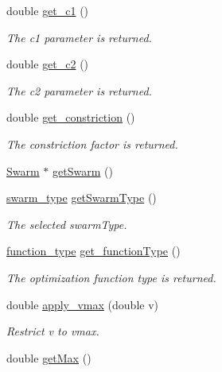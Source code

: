 \begin{CompactItemize}
double \hyperlink{classPSO_93bb160787761b05a7a8512771ac0117}{get\_\-c1} ()
\begin{CompactList}\small\item\em The c1 parameter is returned. \item\end{CompactList}\item 
double \hyperlink{classPSO_39340d6c779a00395bca0b293aa081a9}{get\_\-c2} ()
\begin{CompactList}\small\item\em The c2 parameter is returned. \item\end{CompactList}\item 
double \hyperlink{classPSO_13988ca5dfb95908547160ba71cf8c00}{get\_\-constriction} ()
\begin{CompactList}\small\item\em The constriction factor is returned. \item\end{CompactList}\item 
\hyperlink{classSwarm}{Swarm} $\ast$ \hyperlink{classPSO_73b6f8b856198c230a8e8820c0ff9754}{getSwarm} ()
\item 
\hyperlink{pso_8h_42bcedc2c7cf9459c9669f9df4f61ebd}{swarm\_\-type} \hyperlink{classPSO_51207ecdeef9436d6096923687b029d5}{getSwarmType} ()
\begin{CompactList}\small\item\em The selected swarmType. \item\end{CompactList}\item 
\hyperlink{optfunctions_8h_6e6333c061b2073ba9abaaf67e20164b}{function\_\-type} \hyperlink{classPSO_83130a91287e0dbf1f818bf1b91d382e}{get\_\-functionType} ()
\begin{CompactList}\small\item\em The optimization function type is returned. \item\end{CompactList}\item 
double \hyperlink{classPSO_3ff735011be4811df1ab4d4366f84190}{apply\_\-vmax} (double v)
\begin{CompactList}\small\item\em Restrict v to vmax. \item\end{CompactList}\item 
double \hyperlink{classPSO_e6edebe0b4bb447c95b9ec8c4846daa0}{getMax} ()

\end{CompactItemize}
